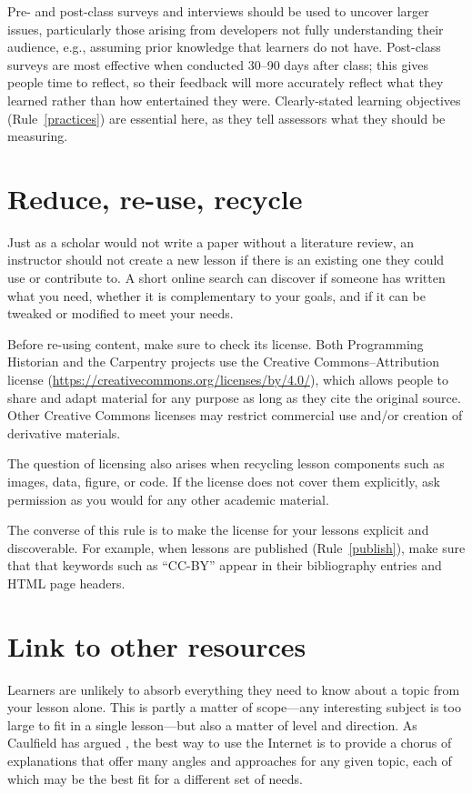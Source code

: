 \documentclass[10pt,letterpaper]{article}
\newcommand{\rulemajor}[2]{\section{#1}\label{#2}}
\newcommand{\ruleref}[1]{Rule~\ref{#1}}
\begin{document}
Pre- and post-class surveys and interviews should be used to uncover larger issues,
particularly those arising from developers not fully understanding their audience,
e.g.,
assuming prior knowledge that learners do not have.
Post-class surveys are most effective when conducted 30--90 days after class;
this gives people time to reflect,
so their feedback will more accurately reflect what they learned
rather than how entertained they were.
Clearly-stated learning objectives (\ruleref{practices}) are essential here,
as they tell assessors what they should be measuring.

\rulemajor{Reduce, re-use, recycle}{rrr}

Just as a scholar would not write a paper without a literature review,
an instructor should not create a new lesson if there is an existing one they could use or contribute to.
A short online search can discover if someone has written what you need,
whether it is complementary to your goals,
and if it can be tweaked or modified to meet your needs.

Before re-using content,
make sure to check its license.
Both Programming Historian and the Carpentry projects
use the Creative Commons--Attribution license
(\url{https://creativecommons.org/licenses/by/4.0/}),
which allows people to share and adapt material for any purpose
as long as they cite the original source.
Other Creative Commons licenses may restrict commercial use
and/or creation of derivative materials.

The question of licensing also arises when recycling lesson components
such as images, data, figure, or code.
If the license does not cover them explicitly,
ask permission as you would for any other academic material.

The converse of this rule is to make the license for your lessons explicit and discoverable.
For example,
when lessons are published (\ruleref{publish}),
make sure that that keywords such as ``CC-BY'' appear in their bibliography entries
and HTML page headers.

\rulemajor{Link to other resources}{link}

Learners are unlikely to absorb everything they need to know about a topic from your lesson alone.
This is partly a matter of scope---any interesting subject is too large
to fit in a single lesson---but also a matter of level and direction.
As Caulfield has argued \cite{choral-explanations},
the best way to use the Internet is to provide a chorus of explanations
that offer many angles and approaches for any given topic,
each of which may be the best fit for a different set of needs.
\end{document}
